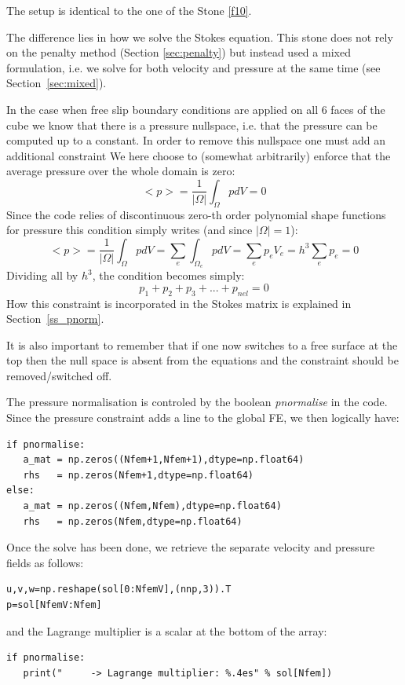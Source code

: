 
The setup is identical to the one of the Stone \ref{f10}.

The difference lies in how we solve the Stokes equation. This stone does not rely on 
the penalty method (Section \ref{sec:penalty}) 
but instead used a mixed formulation, i.e. we solve for both 
velocity and pressure at the same time (see Section~\ref{sec:mixed}).

In the case when free slip boundary conditions are applied on all 
6 faces of the cube we know that there is a pressure nullspace, i.e.
that the pressure can be computed up to a constant. In order to 
remove this nullspace one must add an additional constraint 
We here choose to (somewhat arbitrarily) enforce that the average pressure 
over the whole domain is zero:
\[
<p>=\frac{1}{|\Omega|} \int_\Omega p dV =0 
\]
Since the code relies of discontinuous zero-th order polynomial shape functions 
for pressure this condition simply writes (and since $|\Omega|=1$):
\[
<p>=\frac{1}{|\Omega|} \int_\Omega p dV =  \sum_{e} \int_{\Omega_e} p dV = \sum_e p_e V_e = h^3 \sum_e p_e =0
\]
Dividing all by $h^3$, the condition becomes simply:
\[
p_1 + p_2 + p_3 + ... + p_{nel} = 0
\]
How this constraint is incorporated in the Stokes matrix is explained in Section~\ref{ss_pnorm}.

It is also important to remember that if one now switches to a free surface at the top then 
the null space is absent from the equations and the constraint should be removed/switched off.

The pressure normalisation is controled by the boolean {\sl pnormalise} in the code. 
Since the pressure constraint adds a line to the global FE, we then logically have:
\begin{lstlisting}
if pnormalise:
   a_mat = np.zeros((Nfem+1,Nfem+1),dtype=np.float64) 
   rhs   = np.zeros(Nfem+1,dtype=np.float64)    
else:
   a_mat = np.zeros((Nfem,Nfem),dtype=np.float64)
   rhs   = np.zeros(Nfem,dtype=np.float64)       
\end{lstlisting} 
Once the solve has been done, we retrieve the separate velocity and pressure fields as follows:
\begin{lstlisting}
u,v,w=np.reshape(sol[0:NfemV],(nnp,3)).T
p=sol[NfemV:Nfem]
\end{lstlisting} 
and the Lagrange multiplier is a scalar at the bottom of the array:
\begin{lstlisting}
if pnormalise:
   print("     -> Lagrange multiplier: %.4es" % sol[Nfem])
\end{lstlisting} 

